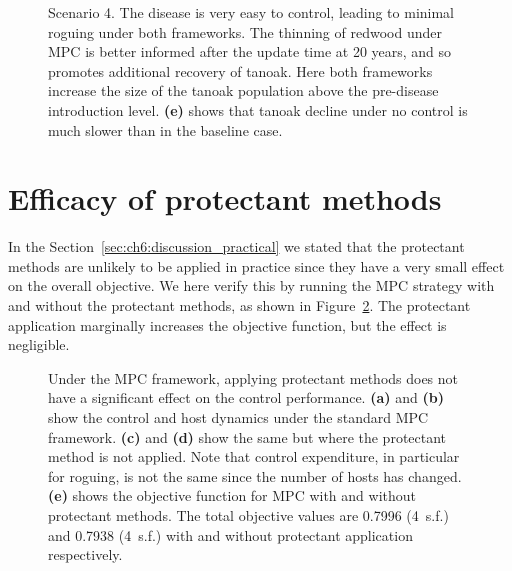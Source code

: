 \begin{figure}[H]
    \begin{center}
        \caption[Parameter uncertainty scenario 4]{Scenario 4. The disease is very easy to control, leading to minimal roguing under both frameworks. The thinning of redwood under MPC is better informed after the update time at 20 years, and so promotes additional recovery of tanoak. Here both frameworks increase the size of the tanoak population above the pre-disease introduction level. \textbf{(e)} shows that tanoak decline under no control is much slower than in the baseline case.\label{fig:case4}}
    \end{center}
\end{figure}

\newpage
\section{Efficacy of protectant methods\label{app:mixed_stand_2}}

In the Section~\ref{sec:ch6:discussion_practical} we stated that the protectant methods are unlikely to be applied in practice since they have a very small effect on the overall objective. We here verify this by running the MPC strategy with and without the protectant methods, as shown in Figure~\ref{fig:effect_protectant}. The protectant application marginally increases the objective function, but the effect is negligible.

\vspace*{\floatsep}
\begin{figure}[H]
    \begin{center}
        \caption[Efficacy of protectant methods]{Under the MPC framework, applying protectant methods does not have a significant effect on the control performance. \textbf{(a)} and \textbf{(b)} show the control and host dynamics under the standard MPC framework. \textbf{(c)} and \textbf{(d)} show the same but where the protectant method is not applied. Note that control expenditure, in particular for roguing, is not the same since the number of hosts has changed. \textbf{(e)} shows the objective function for MPC with and without protectant methods. The total objective values are 0.7996 (4~s.f.) and 0.7938 (4~s.f.) with and without protectant application respectively.\label{fig:effect_protectant}}
    \end{center}
\end{figure}


